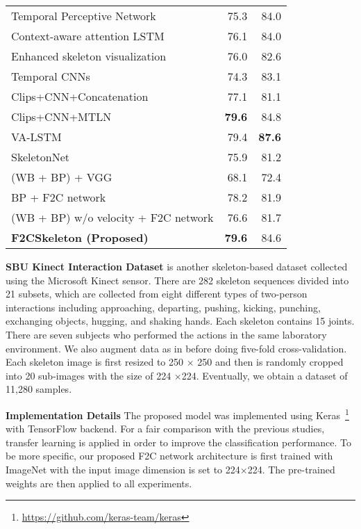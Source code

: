 \documentclass{bmvc2k}
\begin{document}
\begin{table}[t]
\begin{minipage}{0.6\textwidth}
\begin{tabular}{|l|r|r|}
			Temporal Perceptive Network \cite{hutemporal} & 75.3 & 84.0 \\
			Context-aware  attention LSTM \cite{liu2018skeleton} & 76.1 & 84.0 \\
			Enhanced skeleton visualization \cite{liu2017enhanced} & 76.0 & 82.6 \\
			Temporal CNNs\cite{kim2017interpretable} & 74.3 & 83.1 \\
			Clips+CNN+Concatenation \cite{ke2017new} & 77.1 & 81.1 \\
			Clips+CNN+MTLN \cite{ke2017new} & \textbf{79.6} & 84.8 \\
			VA-LSTM \cite{zhang2017view} & 79.4 & \textbf{87.6} \\
			\hline
			SkeletonNet \cite{ke2017skeletonnet} & 75.9 & 81.2 \\
			\hline
			(WB + BP) + VGG & 68.1 & 72.4\\ 
			BP + F2C network & 78.2 & 81.9 \\
			(WB + BP) w/o velocity + F2C network & 76.6 & 81.7 \\ 
			\textbf{F2CSkeleton (Proposed)}& \textbf{79.6} & 84.6\\ 
			\hline
		\end{tabular}
	\end{minipage}
\end{table}
\textbf{SBU Kinect Interaction Dataset}
is another skeleton-based dataset collected using the Microsoft Kinect sensor. There are 282 skeleton sequences divided into 21 subsets, which are collected from eight different types of two-person interactions including approaching, departing, pushing, kicking, punching, exchanging objects, hugging, and shaking hands. Each skeleton contains 15 joints. There are seven subjects who performed the actions in the same laboratory environment. We also augment data as in \cite{ke2017skeletonnet} before doing five-fold cross-validation. Each skeleton image is first resized to 250 $\times$ 250 and then is randomly cropped into 20 sub-images with the size of 224 $\times$224. Eventually, we obtain a dataset of 11,280 samples.

\textbf{Implementation Details}
The proposed model was implemented using Keras~\footnote{\url{https://github.com/keras-team/keras}} with TensorFlow backend. For a fair comparison with the previous studies, transfer learning is applied in order to improve the classification performance. To be more specific, our proposed F2C network architecture is first trained with ImageNet with the input image dimension is set to 224$\times$224. The pre-trained weights are then applied to all experiments.
\end{document}
